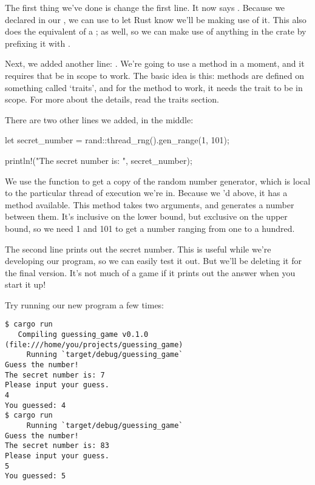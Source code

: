 The first thing we’ve done is change the first line. It now says . Because we declared  in 
our \code{[dependencies]}, we can use  to let Rust know we’ll be making use of it. This also does the 
equivalent of a ; as well, so we can make use of anything in the  crate by prefixing it with 
.

\blank

Next, we added another  line: . We’re going to use a method in a moment, and it requires that 
 be in scope to work. The basic idea is this: methods are defined on something called ‘traits’, and for the method 
to work, it needs the trait to be in scope. For more about the details, read the traits section.

\blank

There are two other lines we added, in the middle:

\begin{rustc}
    let secret_number = rand::thread_rng().gen_range(1, 101);

    println!("The secret number is: {}", secret_number);
\end{rustc}

We use the  function to get a copy of the random number generator, which is local to the particular 
thread of execution we’re in. Because we ’d above, it has a  method available. This 
method takes two arguments, and generates a number between them. It’s inclusive on the lower bound, but exclusive on the upper 
bound, so we need 1 and 101 to get a number ranging from one to a hundred.

\blank

The second line prints out the secret number. This is useful while we’re developing our program, so we can easily test it out. 
But we’ll be deleting it for the final version. It’s not much of a game if it prints out the answer when you start it up!

\blank

Try running our new program a few times:

\begin{verbatim}
$ cargo run
   Compiling guessing_game v0.1.0 (file:///home/you/projects/guessing_game)
     Running `target/debug/guessing_game`
Guess the number!
The secret number is: 7
Please input your guess.
4
You guessed: 4
$ cargo run
     Running `target/debug/guessing_game`
Guess the number!
The secret number is: 83
Please input your guess.
5
You guessed: 5
\end{verbatim}


